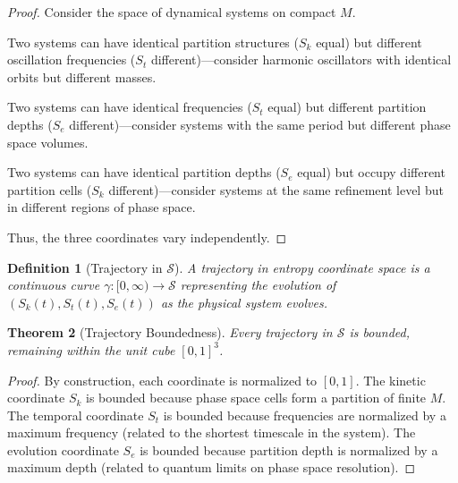 \documentclass[twocolumn,10pt,a4paper]{article}
\newtheorem{theorem}{Theorem}[section]
\newtheorem{definition}[theorem]{Definition}
\newcommand{\Sspace}{\mathcal{S}}
\newcommand{\Sk}{S_k}
\newcommand{\St}{S_t}
\newcommand{\Se}{S_e}
\begin{document}
\begin{proof}
Consider the space of dynamical systems on compact $M$.

Two systems can have identical partition structures ($\Sk$ equal) but different oscillation frequencies ($\St$ different)---consider harmonic oscillators with identical orbits but different masses.

Two systems can have identical frequencies ($\St$ equal) but different partition depths ($\Se$ different)---consider systems with the same period but different phase space volumes.

Two systems can have identical partition depths ($\Se$ equal) but occupy different partition cells ($\Sk$ different)---consider systems at the same refinement level but in different regions of phase space.

Thus, the three coordinates vary independently.
\end{proof}

\begin{definition}[Trajectory in $\Sspace$]
A \emph{trajectory} in entropy coordinate space is a continuous curve $\gamma: [0, \infty) \to \Sspace$ representing the evolution of $(\Sk(t), \St(t), \Se(t))$ as the physical system evolves.
\end{definition}

\begin{theorem}[Trajectory Boundedness]
\label{thm:traj_bound}
Every trajectory in $\Sspace$ is bounded, remaining within the unit cube $[0,1]^3$.
\end{theorem}

\begin{proof}
By construction, each coordinate is normalized to $[0,1]$. The kinetic coordinate $\Sk$ is bounded because phase space cells form a partition of finite $M$. The temporal coordinate $\St$ is bounded because frequencies are normalized by a maximum frequency (related to the shortest timescale in the system). The evolution coordinate $\Se$ is bounded because partition depth is normalized by a maximum depth (related to quantum limits on phase space resolution).
\end{proof}
\end{document}
